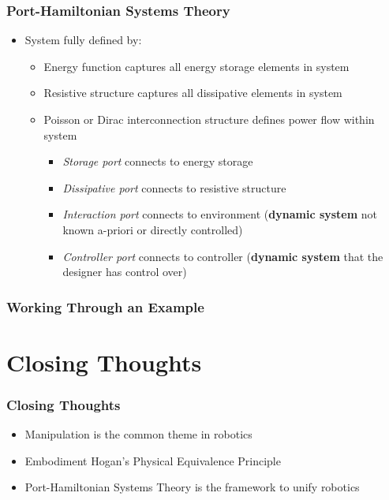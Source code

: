 \documentclass[aspectratio=169,handout]{beamer}
\begin{document}
		\begin{frame}
			\frametitle{Port-Hamiltonian Systems Theory}
			\begin{itemize}
				\item System fully defined by: 
					\begin{itemize}
						\item Energy function captures all energy storage elements in system
						\item Resistive structure captures all dissipative elements in system
						\item Poisson or Dirac interconnection structure defines power flow within system
							\begin{itemize}
								\item \emph{Storage port} connects to energy storage
								\item \emph{Dissipative port} connects to resistive structure
								\item \emph{Interaction port} connects to environment (\textbf{dynamic system} not known a-priori or directly controlled)
								\item \emph{Controller port} connects to controller (\textbf{dynamic system} that the designer has control over)
							\end{itemize}
					\end{itemize}
			\end{itemize}
		\end{frame}
	
		\begin{frame}
			\frametitle{Working Through an Example}
		\end{frame}
	
	\section{Closing Thoughts}
		\begin{frame}
			\frametitle{Closing Thoughts}
			\begin{itemize}
				\item Manipulation is the common theme in robotics
				\item Embodiment \Leftrightarrow Hogan's Physical Equivalence Principle \autocite{hogan1985impedance}
				\item Port-Hamiltonian Systems Theory is the framework to unify robotics
			\end{itemize}
		\end{frame}
		
	\setcounter{showProgressBar}{0}
	\setcounter{showSlideNumbers}{0}
	
\end{document}
